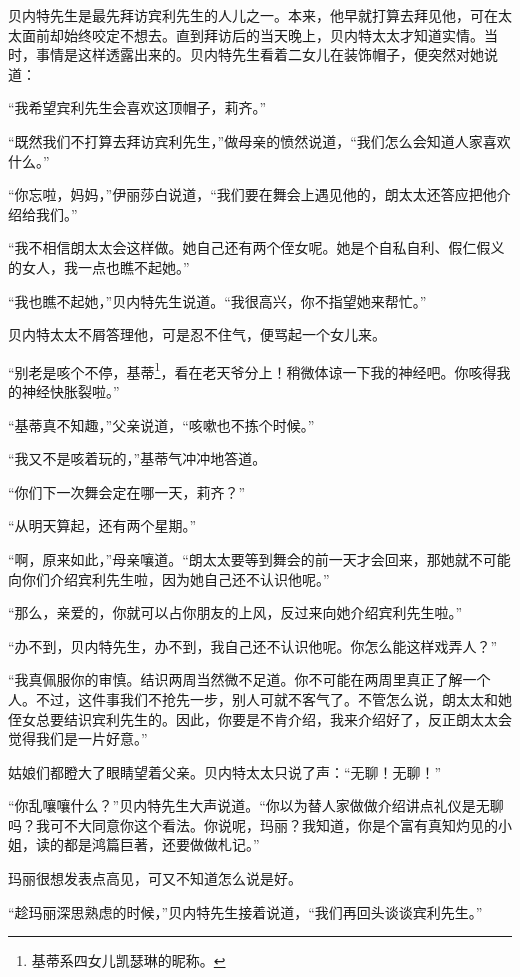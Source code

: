 \par 贝内特先生是最先拜访宾利先生的人儿之一。本来，他早就打算去拜见他，可在太太面前却始终咬定不想去。直到拜访后的当天晚上，贝内特太太才知道实情。当时，事情是这样透露出来的。贝内特先生看着二女儿在装饰帽子，便突然对她说道：
\par “我希望宾利先生会喜欢这顶帽子，莉齐。”
\par “既然我们不打算去拜访宾利先生，”做母亲的愤然说道，“我们怎么会知道人家喜欢什么。”
\par “你忘啦，妈妈，”伊丽莎白说道，“我们要在舞会上遇见他的，朗太太还答应把他介绍给我们。”
\par “我不相信朗太太会这样做。她自己还有两个侄女呢。她是个自私自利、假仁假义的女人，我一点也瞧不起她。”
\par “我也瞧不起她，”贝内特先生说道。“我很高兴，你不指望她来帮忙。”
\par 贝内特太太不屑答理他，可是忍不住气，便骂起一个女儿来。
\par “别老是咳个不停，基蒂\footnote{基蒂系四女儿凯瑟琳的昵称。}，看在老天爷分上！稍微体谅一下我的神经吧。你咳得我的神经快胀裂啦。”
\par “基蒂真不知趣，”父亲说道，“咳嗽也不拣个时候。”
\par “我又不是咳着玩的，”基蒂气冲冲地答道。
\par “你们下一次舞会定在哪一天，莉齐？”
\par “从明天算起，还有两个星期。”
\par “啊，原来如此，”母亲嚷道。“朗太太要等到舞会的前一天才会回来，那她就不可能向你们介绍宾利先生啦，因为她自己还不认识他呢。”
\par “那么，亲爱的，你就可以占你朋友的上风，反过来向她介绍宾利先生啦。”
\par “办不到，贝内特先生，办不到，我自己还不认识他呢。你怎么能这样戏弄人？”
\par “我真佩服你的审慎。结识两周当然微不足道。你不可能在两周里真正了解一个人。不过，这件事我们不抢先一步，别人可就不客气了。不管怎么说，朗太太和她侄女总要结识宾利先生的。因此，你要是不肯介绍，我来介绍好了，反正朗太太会觉得我们是一片好意。”
\par 姑娘们都瞪大了眼睛望着父亲。贝内特太太只说了声：“无聊！无聊！”
\par “你乱嚷嚷什么？”贝内特先生大声说道。“你以为替人家做做介绍讲点礼仪是无聊吗？我可不大同意你这个看法。你说呢，玛丽？我知道，你是个富有真知灼见的小姐，读的都是鸿篇巨著，还要做做札记。”
\par 玛丽很想发表点高见，可又不知道怎么说是好。
\par “趁玛丽深思熟虑的时候，”贝内特先生接着说道，“我们再回头谈谈宾利先生。”
